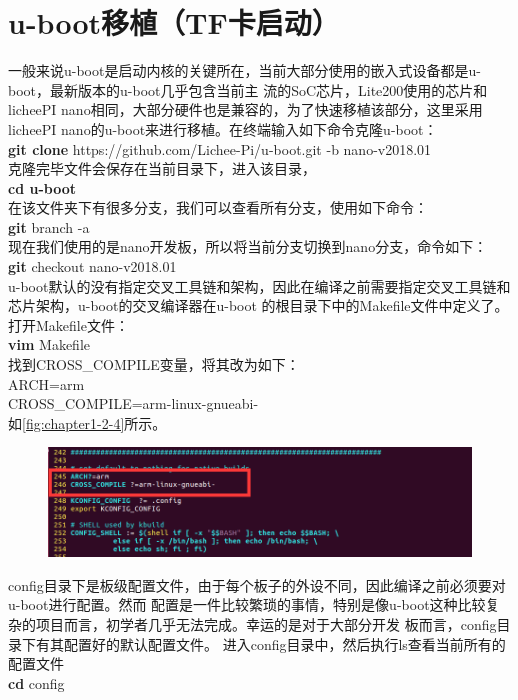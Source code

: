\section{u-boot移植（TF卡启动）}
一般来说u-boot是启动内核的关键所在，当前大部分使用的嵌入式设备都是u-boot，最新版本的u-boot几乎包含当前主
流的SoC芯片，Lite200使用的芯片和licheePI 
nano相同，大部分硬件也是兼容的，为了快速移植该部分，这里采用licheePI
nano的u-boot来进行移植。在终端输入如下命令克隆u-boot：\\
\textbf{git clone}  https://github.com/Lichee-Pi/u-boot.git -b nano-v2018.01  \\
克隆完毕文件会保存在当前目录下，进入该目录，\\
\textbf{cd u-boot} \\
在该文件夹下有很多分支，我们可以查看所有分支，使用如下命令：\\
\textbf{git} branch -a \\
现在我们使用的是nano开发板，所以将当前分支切换到nano分支，命令如下：\\
\textbf{git} checkout nano-v2018.01  \\
u-boot默认的没有指定交叉工具链和架构，因此在编译之前需要指定交叉工具链和芯片架构，u-boot的交叉编译器在u-boot
的根目录下中的Makefile文件中定义了。打开Makefile文件：\\
\textbf{vim} Makefile  \\
找到CROSS\_COMPILE变量，将其改为如下：\\
ARCH=arm  \\
CROSS\_COMPILE=arm-linux-gnueabi-   \\
如\ref{fig:chapter1-2-4}所示。
\begin{figure}[htbp]
	\centering
	\includegraphics[width=1 \linewidth]{chapter2/img/chapter2-2-3}
	\caption{}
	\label{fig:chapter1-2-3}
\end{figure}
config目录下是板级配置文件，由于每个板子的外设不同，因此编译之前必须要对u-boot进行配置。然而
配置是一件比较繁琐的事情，特别是像u-boot这种比较复杂的项目而言，初学者几乎无法完成。幸运的是对于大部分开发
板而言，config目录下有其配置好的默认配置文件。 进入config目录中，然后执行ls查看当前所有的配置文件\\
\textbf{cd} config \\
